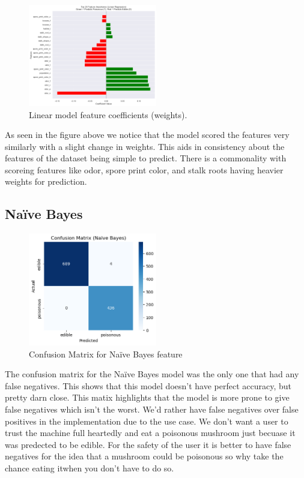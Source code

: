 \documentclass[conference]{IEEEtran}
\begin{document}
\begin{figure}[!htbp]
\centering
\includegraphics[width=0.5\textwidth]{images/linFeatures.png}
\caption{Linear model feature coefficients (weights).}
\label{fig:lin_features}
\end{figure}
\FloatBarrier
As seen in the figure above we notice that the model scored the features very similarly with a slight change in weights. This aids in consistency about the features of the dataset being simple to predict. There is a commonality with scoreing features like odor, spore print color, and stalk roots having heavier weights for prediction.

\subsection{Naïve Bayes}
\begin{figure}[!htbp]
\centering
\includegraphics[width=0.5\textwidth]{images/naiveBayesConf.png}
\caption{Confusion Matrix for Naïve Bayes feature}
\label{fig:nb_features}
\end{figure}
\FloatBarrier

The confusion matrix for the Naïve Bayes model was the only one that had any false negatives. This shows that this model doesn't have perfect accuracy, but pretty darn close. This matix highlights that the model is more prone to give false negatives which isn't the worst. We'd rather have false negatives over false positives in the implementation due to the use case. We don't want a user to trust the machine full heartedly and eat a poisonous mushroom just becuase it was predected to be edible. For the safety of the user it is better to have false negatives for the idea that a mushroom could be poisonous so why take the chance eating itwhen you don't have to do so.
\end{document}
